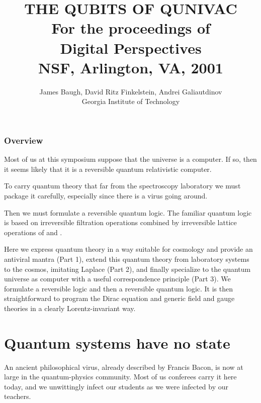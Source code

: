 \documentclass[a4paper,11pt]{article}
\title{{\Huge \bf THE QUBITS OF QUNIVAC}\\
{\large For the proceedings of}\\
Digital Perspectives\\
{\large NSF, Arlington, VA, 2001}
}
\author {James Baugh,
David Ritz Finkelstein, Andrei Galiautdinov\\
Georgia Institute of Technology}
\begin{document}
\maketitle


\section{Overview}

Most of us at this symposium suppose 
that the universe is a computer.
If so,
then it seems likely that it is
a reversible quantum relativistic computer.

To carry quantum theory
that far from 
the spectroscopy laboratory
we must 
package it carefully,
especially since 
there is a virus
going around.

Then we must formulate a reversible quantum logic.
The familiar quantum logic is based on irreversible
filtration operations
combined by irreversible lattice operations
of \myHighlight{$\cup$}\coordHE{} and \myHighlight{$\cap$}\coordHE{}.

Here
we express quantum theory in a 
way suitable for cosmology
and provide
an antiviral mantra (Part 1),
extend this quantum theory 
from laboratory systems to the cosmos,
imitating Laplace (Part 2),
and finally specialize to the quantum universe as
computer
with a useful correspondence principle (Part 3).
We formulate a reversible logic
and then a reversible quantum logic.
It is then straightforward to
program the Dirac equation and 
generic field
and gauge theories
in a clearly Lorentz-invariant way.


\part{\Huge Quantum systems have no state}

An ancient philosophical virus, 
already described by Francis Bacon,
is now at large in the quantum-physics community.
Most of us conferees carry it here today,
and we unwittingly 
infect our students as we were infected by our teachers.
\end{document}
